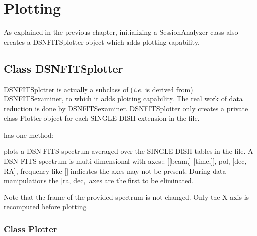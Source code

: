 \documentclass[letterpaper,11pt]{book}
\begin{document}
\chapter{Plotting}\label{chap:plotting}

As explained in the previous chapter, initializing a {\ttfamily SessionAnalyzer}
class also creates a {\ttfamily DSNFITSplotter} object which adds plotting
capability.

\section{Class {\ttfamily DSNFITSplotter}}\label{sec:plotter}

{\ttfamily DSNFITSplotter} is actually a subclass of ({\itshape i.e.} is
derived from) {\ttfamily DSNFITSexaminer}, to which it adds plotting capability.
The real work of data reduction is done by {\ttfamily DSNFITSexaminer}.
{\ttfamily DSNFITSplotter} only creates a private class {\ttfamily Plotter}
object for each SINGLE DISH extension in the file.

 has one method:
\begin{description}\itemsep0pt \parskip0pt 
\item [plot\_average()] plots a DSN FITS spectrum averaged over the SINGLE DISH
tables in the file.  A DSN FITS spectrum is multi-dimensional with axes::
    [[beam,] [time,]], pol, [dec, RA], frequency-like
[] indicates the axes may not be present.  During data manipulations the
[ra, dec,] axes are the first to be eliminated.
    
Note that the frame of the provided spectrum is not changed.  Only the
X-axis is recomputed before plotting.
\end{description}


\subsection{Class {\ttfamily Plotter}}
\end{document}
